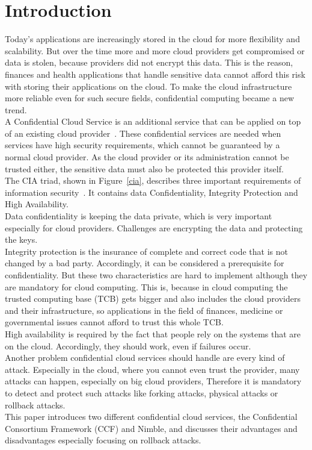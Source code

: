 \section{Introduction}
Today's applications are increasingly stored in the cloud for more flexibility and scalability. %
 But over the time more and more cloud providers get compromised or data is stolen, because providers did not encrypt this data. This is the reason, finances and health applications that handle sensitive data cannot afford this risk with storing their applications on the cloud. To make the cloud infrastructure more reliable even for such secure fields, confidential computing became a new trend.\\
 A Confidential Cloud Service is an additional service that can be applied on top of an existing cloud provider~\cite{confidentiality}. These confidential services are needed when services have high security requirements, which cannot be guaranteed by a normal cloud provider. As the cloud provider or its administration cannot be trusted either, the sensitive data must also be protected this provider itself. \\
 The CIA triad,  shown in Figure~\ref{cia},  describes three important requirements of information security~\cite{ciaBook, cia}. It contains data Confidentiality, Integrity Protection and High Availability.\\
 Data confidentiality is keeping the data private, which is very important especially for cloud providers. Challenges are encrypting the data and protecting the keys.\\
 Integrity protection is the insurance of complete and correct code that is not changed by a bad party. Accordingly, it can be considered a prerequisite for confidentiality. But these two characteristics are hard to implement although they are mandatory for cloud computing. This is, because in cloud computing the trusted computing base (TCB) gets bigger and also includes the cloud providers and their infrastructure, so applications in the field of finances, medicine or governmental issues cannot afford to trust this whole TCB.\\
 High availability is required by the fact that people rely on the systems that are on the cloud. Accordingly, they should work, even if failures occur.\\
 Another problem confidential cloud services should handle are every kind of attack. Especially in the cloud, where you cannot even trust the provider, many attacks can happen, especially on big cloud providers, Therefore it is mandatory to detect and protect such attacks like forking attacks, physical attacks or rollback attacks.\\
 This paper introduces two different confidential cloud services, the Confidential Consortium Framework (CCF) and Nimble,  and discusses their advantages and disadvantages especially focusing on rollback attacks. 
	 